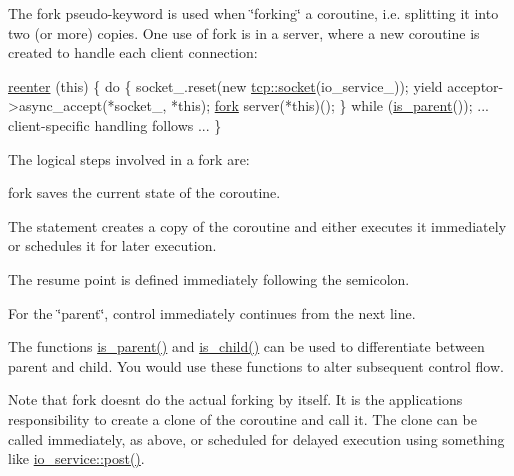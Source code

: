The {\ttfamily fork} pseudo-\/keyword is used when \char`\"{}forking\char`\"{} a coroutine, i.\+e. splitting it into two (or more) copies. One use of {\ttfamily fork} is in a server, where a new coroutine is created to handle each client connection\+:


\begin{DoxyCode}
 \hyperlink{yield_8hpp_a845826f234aec2b016cac4e60aff9bb5}{reenter} (\textcolor{keyword}{this})
\{
  \textcolor{keywordflow}{do}
  \{
    socket\_.reset(\textcolor{keyword}{new} \hyperlink{namespacewebsocketpp_1_1transport_1_1asio_1_1socket_1_1error_a828ddaa5ed63a761e1b557465a35f05aa0c31b356014843e1d09514e794a539a7}{tcp::socket}(io\_service\_));
    yield acceptor->async\_accept(*socket\_, *\textcolor{keyword}{this});
    \hyperlink{yield_8hpp_ab2e49d0b8dbb3181c7d1f622fd5ea1b4}{fork} server(*\textcolor{keyword}{this})();
  \} \textcolor{keywordflow}{while} (\hyperlink{classasio_1_1coroutine_ab5ed275eee663bca6638668ff27dd40d}{is\_parent}());
  ... client-specific handling follows ...
\} 
\end{DoxyCode}


The logical steps involved in a {\ttfamily fork} are\+:

\begin{DoxyItemize}
\item {\ttfamily fork} saves the current state of the coroutine. \item The statement creates a copy of the coroutine and either executes it immediately or schedules it for later execution. \item The resume point is defined immediately following the semicolon. \item For the \char`\"{}parent\char`\"{}, control immediately continues from the next line.\end{DoxyItemize}
The functions \hyperlink{classasio_1_1coroutine_ab5ed275eee663bca6638668ff27dd40d}{is\+\_\+parent()} and \hyperlink{classasio_1_1coroutine_ab7693e381b3fc429bc12393c73f507a3}{is\+\_\+child()} can be used to differentiate between parent and child. You would use these functions to alter subsequent control flow.

Note that {\ttfamily fork} doesn\textquotesingle{}t do the actual forking by itself. It is the application\textquotesingle{}s responsibility to create a clone of the coroutine and call it. The clone can be called immediately, as above, or scheduled for delayed execution using something like \hyperlink{classasio_1_1io__service_ae01f809800017295e39786f5bca6652e}{io\+\_\+service\+::post()}.

